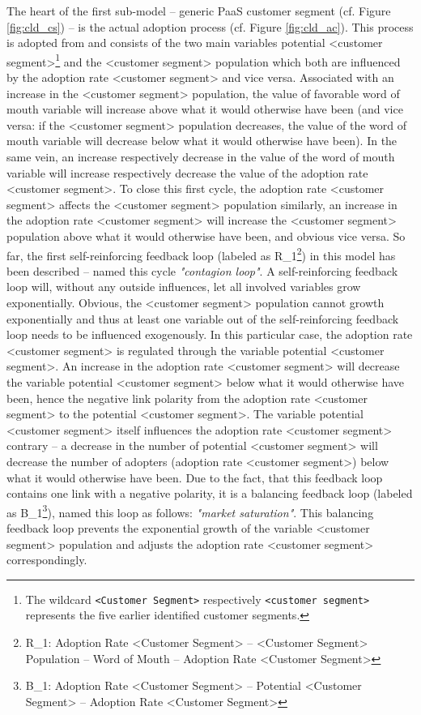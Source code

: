 The heart of the first sub-model -- generic \ac{PaaS} customer segment (cf. Figure \ref{fig:cld_cs}) -- is the actual adoption process (cf. Figure \ref{fig:cld_ac}). This process is adopted from \citet[p. 18]{Sterman2001} and consists of the two main variables potential <customer segment>\footnote{The wildcard \texttt{<Customer Segment>} respectively \texttt{<customer segment>} represents the five earlier identified customer segments.} and the <customer segment> population which both are influenced by the adoption rate <customer segment> and vice versa. Associated with an increase in the <customer segment> population, the value of favorable word of mouth variable will increase above what it would otherwise have been (and vice versa: if the <customer segment> population decreases, the value of the word of mouth variable will decrease below what it would otherwise have been). In the same vein, an increase respectively decrease in the value of the word of mouth variable will increase respectively decrease the value of the adoption rate <customer segment>. To close this first cycle, the adoption rate <customer segment> affects the <customer segment> population similarly, an increase in the adoption rate <customer segment> will increase the <customer segment> population above what it would otherwise have been, and obvious vice versa. So far, the first self-reinforcing feedback loop (labeled as R\_1\footnote{R\_1: Adoption Rate <Customer Segment> -- <Customer Segment> Population -- Word of Mouth -- Adoption Rate <Customer Segment>}) in this model has been described -- \citet[p. 19]{Sterman2001} named this cycle \textit{"contagion loop"}. A self-reinforcing feedback loop will, without any outside influences, let all involved variables grow exponentially. Obvious, the <customer segment> population cannot growth exponentially and thus at least one variable out of the self-reinforcing feedback loop needs to be influenced exogenously. In this particular case, the adoption rate <customer segment> is regulated through the variable potential <customer segment>. An increase in the adoption rate <customer segment> will decrease the variable potential <customer segment> below what it would otherwise have been, hence the negative link polarity from the adoption rate <customer segment> to the potential <customer segment>. The variable potential <customer segment> itself influences the adoption rate <customer segment> contrary -- a decrease in the number of potential <customer segment> will decrease the number of adopters (adoption rate <customer segment>) below what it would otherwise have been. Due to the fact, that this feedback loop contains one link with a negative polarity, it is a balancing feedback loop (labeled as B\_1\footnote{B\_1: Adoption Rate <Customer Segment> -- Potential <Customer Segment> -- Adoption Rate <Customer Segment>}), \citet[p. 18]{Sterman2001} named this loop as follows: \textit{"market saturation"}. This balancing feedback loop prevents the exponential growth of the variable <customer segment> population and adjusts the adoption rate <customer segment> correspondingly.


